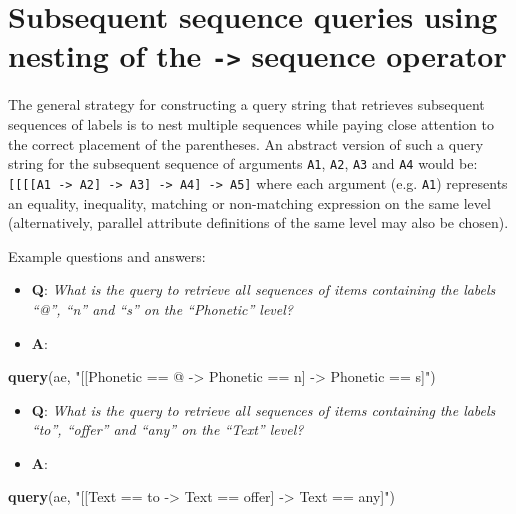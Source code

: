 \documentclass[]{book}
\newenvironment{Shaded}{\begin{snugshade}}{\end{snugshade}}
\newcommand{\KeywordTok}[1]{\textcolor[rgb]{0.13,0.29,0.53}{\textbf{#1}}}
\newcommand{\NormalTok}[1]{#1}
\newcommand{\StringTok}[1]{\textcolor[rgb]{0.31,0.60,0.02}{#1}}
\providecommand{\tightlist}{%
  \setlength{\itemsep}{0pt}\setlength{\parskip}{0pt}}
\theoremstyle{definition}
\theoremstyle{definition}
\theoremstyle{definition}
\theoremstyle{remark}
\begin{document}
\hypertarget{subsequent-sequence-queries-using-nesting-of-the---sequence-operator}{%
\section{\texorpdfstring{Subsequent sequence queries using nesting of
the \texttt{-\textgreater{}} sequence
operator}{Subsequent sequence queries using nesting of the -\textgreater{} sequence operator}}\label{subsequent-sequence-queries-using-nesting-of-the---sequence-operator}}

The general strategy for constructing a query string that retrieves
subsequent sequences of labels is to nest multiple sequences while
paying close attention to the correct placement of the parentheses. An
abstract version of such a query string for the subsequent sequence of
arguments \texttt{A1}, \texttt{A2}, \texttt{A3} and \texttt{A4} would
be:
\texttt{{[}{[}{[}{[}A1\ -\textgreater{}\ A2{]}\ -\textgreater{}\ A3{]}\ -\textgreater{}\ A4{]}\ -\textgreater{}\ A5{]}}
where each argument (e.g. \texttt{A1}) represents an equality,
inequality, matching or non-matching expression on the same level
(alternatively, parallel attribute definitions of the same level may
also be chosen).

Example questions and answers:

\begin{itemize}
\tightlist
\item
  \textbf{Q}: \emph{What is the query to retrieve all sequences of items
  containing the labels ``@'', ``n'' and ``s'' on the ``Phonetic''
  level?}
\item
  \textbf{A}:
\end{itemize}

\begin{Shaded}
\begin{Highlighting}[]
\KeywordTok{query}\NormalTok{(ae, }\StringTok{"[[Phonetic == @ -> Phonetic == n] -> Phonetic == s]"}\NormalTok{)}
\end{Highlighting}
\end{Shaded}

\begin{itemize}
\tightlist
\item
  \textbf{Q}: \emph{What is the query to retrieve all sequences of items
  containing the labels ``to'', ``offer'' and ``any'' on the ``Text''
  level?}
\item
  \textbf{A}:
\end{itemize}

\begin{Shaded}
\begin{Highlighting}[]
\KeywordTok{query}\NormalTok{(ae, }\StringTok{"[[Text == to -> Text == offer] -> Text == any]"}\NormalTok{)}
\end{Highlighting}
\end{Shaded}
\end{document}
